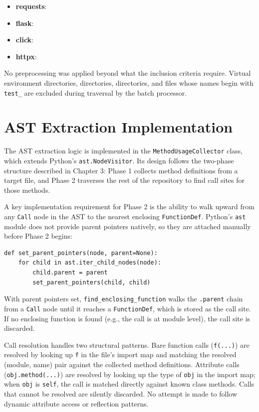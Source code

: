 \documentclass[12pt]{report}
\begin{document}
\begin{itemize}
    \item \textbf{requests}: 
    \item \textbf{flask}: 
    \item \textbf{click}: 
    \item \textbf{httpx}: 
\end{itemize}

No preprocessing was applied beyond what the inclusion criteria require. Virtual environment directories,  directories,  directories, and files whose names begin with \texttt{test\_} are excluded during traversal by the batch processor.

\section{AST Extraction Implementation}

The AST extraction logic is implemented in the \texttt{MethodUsageCollector} class, which extends Python's \texttt{ast.NodeVisitor}. Its design follows the two-phase structure described in Chapter 3: Phase 1 collects method definitions from a target file, and Phase 2 traverses the rest of the repository to find call sites for those methods.

A key implementation requirement for Phase 2 is the ability to walk upward from any \texttt{Call} node in the AST to the nearest enclosing \texttt{FunctionDef}. Python's \texttt{ast} module does not provide parent pointers natively, so they are attached manually before Phase 2 begins:

\begin{lstlisting}[caption={Parent pointer attachment enables upward traversal from call nodes.}, label={lst:parents}]
def set_parent_pointers(node, parent=None):
    for child in ast.iter_child_nodes(node):
        child.parent = parent
        set_parent_pointers(child, child)
\end{lstlisting}

With parent pointers set, \texttt{find\_enclosing\_function} walks the \texttt{.parent} chain from a \texttt{Call} node until it reaches a \texttt{FunctionDef}, which is stored as the call site. If no enclosing function is found (e.g., the call is at module level), the call site is discarded.

Call resolution handles two structural patterns. Bare function calls (\texttt{f(...)}) are resolved by looking up \texttt{f} in the file's import map and matching the resolved (module, name) pair against the collected method definitions. Attribute calls (\texttt{obj.method(...)}) are resolved by looking up the type of \texttt{obj} in the import map; when \texttt{obj} is \texttt{self}, the call is matched directly against known class methods. Calls that cannot be resolved are silently discarded. No attempt is made to follow dynamic attribute access or reflection patterns.
\end{document}
